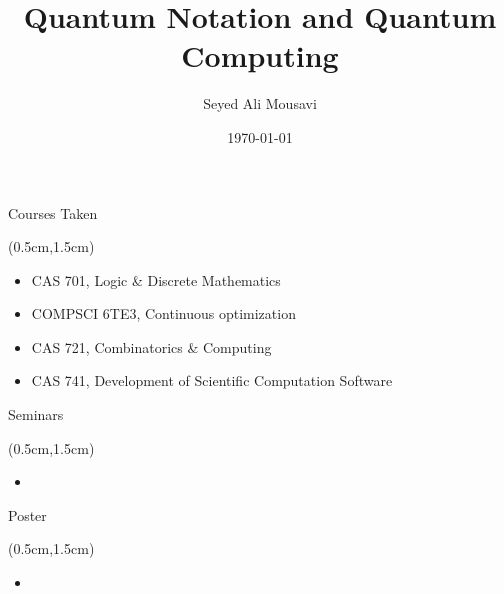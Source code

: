 \documentclass{beamer}
\title{Quantum Notation and Quantum Computing}
\author{Seyed Ali Mousavi}
\date{\today}
\theoremstyle{definition}
\begin{document}
\begin{frame}
    \titlepage
\end{frame}





\begin{frame}{Courses Taken}
    
    \begin{textblock*}{12cm}(0.5cm,1.5cm)
       \begin{itemize}
        \item CAS 701,  Logic \& Discrete Mathematics
        \item COMPSCI 6TE3, Continuous optimization
        \item CAS 721, Combinatorics \& Computing
        \item CAS 741, Development of Scientific Computation Software
       \end{itemize}
    \end{textblock*}
    


\end{frame}







\begin{frame}{Seminars}
    
    \begin{textblock*}{12cm}(0.5cm,1.5cm)
       \begin{itemize}
        \item 
       \end{itemize}
    \end{textblock*}
    

\end{frame}




\begin{frame}{Poster}
    
    \begin{textblock*}{12cm}(0.5cm,1.5cm)
       \begin{itemize}
        \item 
       \end{itemize}
    \end{textblock*}
    

\end{frame}
\end{document}
